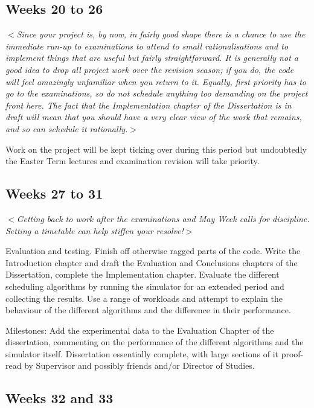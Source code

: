 \documentclass[12pt]{article}
\newcommand{\al}{$<$}
\newcommand{\ar}{$>$}
\begin{document}
\subsection*{Weeks 20 to 26}

\al\emph{Since your project is, by now, in fairly good shape there is
  a chance to use the immediate run-up to examinations to attend to
  small rationalisations and to implement things that are useful but
  fairly straightforward.  It is generally not a good idea to drop all
  project work over the revision season; if you do, the code will feel
  amazingly unfamiliar when you return to it.  Equally, first priority
  has to go to the examinations, so do not schedule anything too
  demanding on the project front here.  The fact that the
  Implementation chapter of the Dissertation is in draft will mean
  that you should have a very clear view of the work that remains, and
  so can schedule it rationally.}\ar

Work on the project will be kept ticking over during this period but
undoubtedly the Easter Term lectures and examination revision will
take priority.


\subsection*{Weeks 27 to 31}

\al\emph{Getting back to work after the examinations and May Week
  calls for discipline.  Setting a timetable can help stiffen your
  resolve!}\ar

Evaluation and testing.  Finish off otherwise ragged parts of the
code.  Write the Introduction chapter and draft the Evaluation and
Conclusions chapters of the Dissertation, complete the Implementation
chapter.  Evaluate the different scheduling algorithms by running the
simulator for an extended period and collecting the results.  Use a
range of workloads and attempt to explain the behaviour of the
different algorithms and the difference in their
performance.

Milestones: Add the experimental data to the Evaluation Chapter of the
dissertation, commenting on the performance of the different
algorithms and the simulator itself.  Dissertation essentially
complete, with large sections of it proof-read by Supervisor and
possibly friends and/or Director of Studies.


\subsection*{Weeks 32 and 33}
\end{document}
